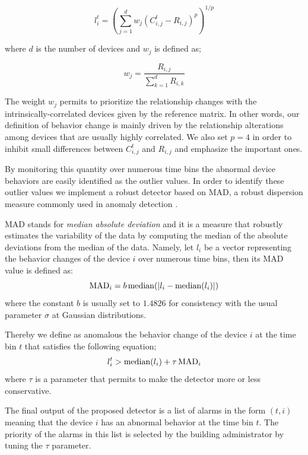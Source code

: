 \[ l^t_{i} = \left(\sum_{j=1}^d  w_j\left(C^t_{i,j} - R_{i,j}\right)^p\right)^{1/p} \]

where $d$ is the number of devices and $w_j$ is defined as;

\[ w_j = \frac{R_{i,j}}{\sum_{k=1}^d R_{i,k}} \]

The weight $w_j$ permits to prioritize the relationship changes with the intrinsically-correlated devices given by the reference matrix.
In other words, our definition of behavior change is mainly driven by the relationship alterations among devices that are usually highly correlated.
We also set $p=4$ in order to inhibit small differences between $C^t_{i,j}$ and $R_{i,j}$ and emphasize the important ones.

By monitoring this quantity over numerous time bins the abnormal device behaviors are easily identified as the outlier values.
In order to identify these outlier values we implement a robust detector based on MAD, a robust dispersion measure commonly used in anomaly detection \cite{huber:wiley2009,chan:springer2005}.

MAD stands for \emph{median absolute deviation} and it is a measure that robustly estimates the variability of the data by computing the median of the absolute deviations from the median of the data.
Namely, let $l_{i}$ be a vector representing the behavior changes of the device $i$ over numerous time bins, then its MAD value is defined as:
\[ \operatorname{MAD}_i = b \operatorname{median}(\lvert l_{i} - \operatorname{median}(l_{i})\rvert)\]
where the constant $b$ is usually set to $1.4826$ for consistency with the usual parameter $\sigma$ at Gaussian distributions.

Thereby we define as anomalous the behavior change of the device $i$ at the time bin $t$ that satisfies the following equation;
\[l^t_{i} > \operatorname{median}(l_{i}) + \tau  \operatorname{MAD}_i\]
where $\tau$ is a parameter that permits to make the detector more or less conservative.

The final output of the proposed detector is a list of alarms in the form $(t,i)$ meaning that the device $i$ has an abnormal behavior at the time bin $t$.
The priority of the alarms in this list is selected by the building administrator by tuning the $\tau$ parameter.

